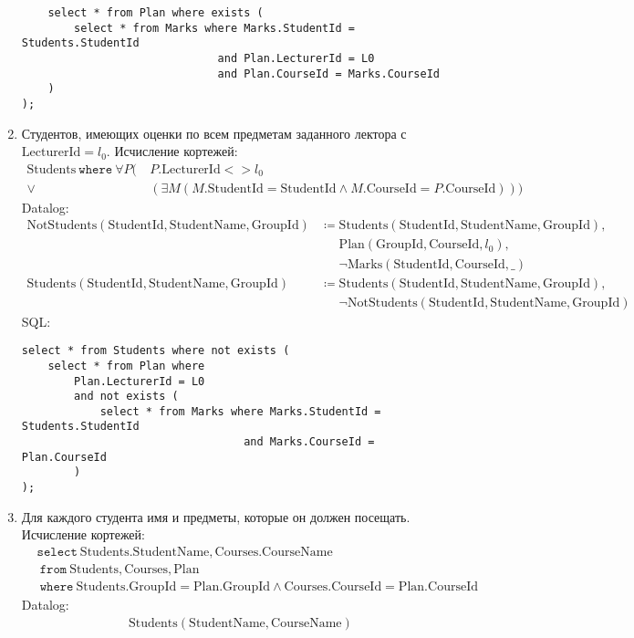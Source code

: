 \documentclass{article}
\newcommand{\Students}{\mathrm{Students}}
\newcommand{\StudentId}{\mathrm{StudentId}}
\newcommand{\StudentName}{\mathrm{StudentName}}
\newcommand{\GroupId}{\mathrm{GroupId}}
\newcommand{\Courses}{\mathrm{Courses}}
\newcommand{\CourseId}{\mathrm{CourseId}}
\newcommand{\CourseName}{\mathrm{CourseName}}
\newcommand{\Plan}{\mathrm{Plan}}
\newcommand{\LecturerId}{\mathrm{LecturerId}}
\newcommand{\Marks}{\mathrm{Marks}}
\newcommand{\select}{\mathtt{select}~}
\newcommand{\from}{~\mathtt{from}~}
\newcommand{\where}{~\mathtt{where}~}
\newcommand{\poloneq}{\mathrel{\phantom{\coloneq}}}
\begin{document}
\begin{enumerate}
\begin{verbatim}
    select * from Plan where exists (
        select * from Marks where Marks.StudentId = Students.StudentId
                              and Plan.LecturerId = L0
                              and Plan.CourseId = Marks.CourseId
    )
);
    \end{verbatim}
    \item Студентов, имеющих оценки по всем предметам заданного
        лектора с $\LecturerId=l_0$.
    Исчисление кортежей:
    \begin{align*}
        \Students \where \forall P
        (&\ P.\LecturerId <> l_0\\
        \lor&\ (\exists M (M.\StudentId = \StudentId
        \land M.\CourseId = P.\CourseId)))
    \end{align*}
    Datalog:
    \begin{align*}
        \mathrm{NotStudents}(\StudentId, \StudentName, \GroupId)
        &\coloneq \Students(\StudentId, \StudentName, \GroupId), \\
        &\poloneq \Plan(\GroupId, \CourseId, l_0), \\
        &\poloneq \neg \Marks(\StudentId, \CourseId, \_) \\
        \Students(\StudentId, \StudentName, \GroupId)
        &\coloneq \Students(\StudentId, \StudentName, \GroupId), \\
        &\poloneq
            \neg \mathrm{NotStudents}(\StudentId, \StudentName, \GroupId)
    \end{align*}
    SQL:
    \begin{verbatim}
select * from Students where not exists (
    select * from Plan where
        Plan.LecturerId = L0
        and not exists (
            select * from Marks where Marks.StudentId = Students.StudentId
                                  and Marks.CourseId = Plan.CourseId
        )
);
    \end{verbatim}
    \item Для каждого студента имя и предметы, которые он должен посещать.
    Исчисление кортежей:
    \begin{align*}
        &\select \Students.\StudentName, \Courses.\CourseName \\
        &\from \Students, \Courses, \Plan \\
        &\where \Students.\GroupId = \Plan.\GroupId
            \land \Courses.\CourseId = \Plan.\CourseId
    \end{align*}
    Datalog:
    \begin{align*}
        \Students(\StudentName, \CourseName)

\end{align*}
\end{enumerate}
\end{document}

